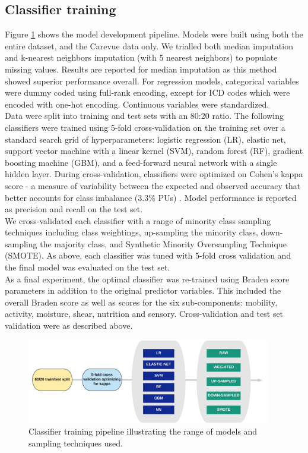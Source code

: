 \documentclass{ws-procs11x85}
\begin{document}
\subsection{Classifier training}
Figure \ref{fig-modeling-pipeline} shows the model development pipeline. Models were built using both the entire dataset, and the Carevue data only. We trialled both median imputation and k-nearest neighbors imputation (with 5 nearest neighbors) to populate missing values. Results are reported for median imputation as this method showed superior performance overall. For regression models, categorical variables were dummy coded using full-rank encoding, except for ICD codes which were encoded with one-hot encoding. Continuous variables were standardized. \\

\noindent
Data were split into training and test sets with an 80:20 ratio. The following classifiers were trained using 5-fold cross-validation on the training set over a standard search grid of hyperparameters: logistic regression (LR), elastic net, support vector machine with a linear kernel (SVM), random forest (RF), gradient boosting machine (GBM), and a feed-forward neural network with a single hidden layer. During cross-validation, classifiers were optimized on Cohen's kappa score - a measure of variability between the expected and observed accuracy that better accounts for class imbalance (3.3\% PUs) \cite{kappa}. Model performance is reported as precision and recall on the test set. \\

\noindent
We cross-validated each classifier with a range of minority class sampling techniques including class weightings, up-sampling the minority class, down-sampling the majority class, and Synthetic Minority Oversampling Technique (SMOTE). As above, each classifier was tuned with 5-fold cross validation and the final model was evaluated on the test set. \\

\noindent
As a final experiment, the optimal classifier was re-trained using Braden score parameters in addition to the original predictor variables. This included the overall Braden score as well as scores for the six sub-components: mobility, activity, moisture, shear, nutrition and sensory. Cross-validation and test set validation were as described above. 

\begin{figure}[H]
  \centering
  \includegraphics[width=0.95\textwidth]{figures/modeling-pipeline.png}
  \caption{\label{fig-modeling-pipeline}\footnotesize Classifier training pipeline illustrating the range of models and sampling techniques used. }
\end{figure}
\end{document}
